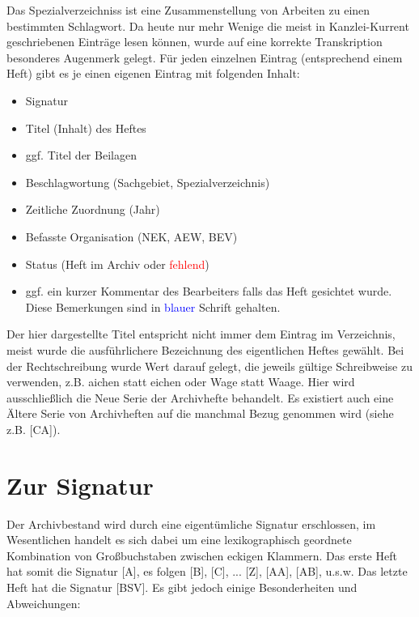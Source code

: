 \documentclass[a4paper]{scrbook}
\begin{document}
Das Spezialverzeichniss ist eine Zusammenstellung von Arbeiten zu einen bestimmten Schlagwort.
Da heute nur mehr Wenige die meist in Kanzlei-Kurrent geschriebenen Einträge lesen können, wurde auf eine korrekte Transkription besonderes Augenmerk gelegt.  Für jeden einzelnen Eintrag (entsprechend einem Heft) gibt es je einen eigenen Eintrag mit folgenden Inhalt:

\begin{itemize}
\item Signatur
\item Titel (Inhalt) des Heftes
\item ggf. Titel der Beilagen 
\item Beschlagwortung (Sachgebiet, Spezialverzeichnis)
\item Zeitliche Zuordnung (Jahr)
\item Befasste Organisation (NEK, AEW, BEV)
\item Status (Heft im Archiv oder \textcolor{red}{fehlend})
\item ggf. ein kurzer Kommentar des Bearbeiters falls das Heft gesichtet wurde. Diese Bemerkungen sind in \textcolor{blue}{blauer} Schrift gehalten.
\end{itemize}

Der hier dargestellte Titel entspricht nicht immer dem Eintrag im Verzeichnis, meist wurde die ausführlichere Bezeichnung des eigentlichen Heftes gewählt. Bei der Rechtschreibung wurde Wert darauf gelegt, die jeweils gültige Schreibweise zu verwenden, z.B. {\glqq}aichen{\grqq} statt {\glqq}eichen{\grqq} oder {\glqq}Wage{\grqq} statt {\glqq}Waage{\grqq}. Hier wird ausschließlich die {\glqq}Neue Serie{\grqq} der Archivhefte behandelt. Es existiert auch eine {\glqq}Ältere Serie{\grqq} von Archivheften auf die manchmal Bezug genommen wird (siehe z.B. [CA]).

\section{Zur Signatur}

Der Archivbestand wird durch eine eigentümliche Signatur erschlossen, im Wesentlichen handelt es sich dabei um eine lexikographisch geordnete Kombination von Großbuchstaben zwischen eckigen Klammern. Das erste Heft hat somit die Signatur [A], es folgen [B], [C], ... [Z], [AA], [AB], u.s.w. Das letzte Heft hat die Signatur [BSV]. Es gibt jedoch einige Besonderheiten und Abweichungen:
\end{document}
